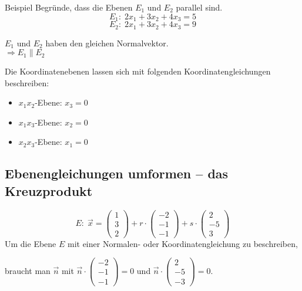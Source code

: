 \documentclass{article}
\begin{document}
\begin{boxx}[DarkBlue]{Beispiel}
    Begründe, dass die Ebenen $E_1$ und $E_2$ parallel sind.
    \[E_1:\; 2x_1 + 3x_2 + 4x_3 = 5\]
    \[E_2:\; 2x_1 + 3x_2 + 4x_3 = 9\]
    \begin{center}
        $E_1$ und $E_2$ haben den gleichen Normalvektor.\\
        $\Rightarrow E_1 \parallel E_2$
    \end{center}
\end{boxx}
Die Koordinatenebenen lassen sich mit folgenden Koordinatengleichungen beschreiben:
\begin{itemize}
    \item $x_1x_2$-Ebene: $x_3 = 0$
    \item $x_1x_3$-Ebene: $x_2 = 0$
    \item $x_2x_3$-Ebene: $x_1 = 0$
\end{itemize}
\subsection{Ebenengleichungen umformen -- das Kreuzprodukt}
\[E:\; \vec{x} = \begin{pmatrix}1\\3\\2\end{pmatrix} + r \cdot \begin{pmatrix}-2\\-1\\-1\end{pmatrix} + s \cdot \begin{pmatrix}2\\-5\\3\end{pmatrix}\]
Um die Ebene $E$ mit einer Normalen- oder Koordinatengleichung zu beschreiben, 

braucht man $\vec{n}$ mit 
$\displaystyle \vec{n} \cdot \begin{pmatrix}-2\\-1\\-1\end{pmatrix} = 0$ 
und $\displaystyle \vec{n} \cdot \begin{pmatrix}2\\-5\\-3\end{pmatrix} = 0$.
\end{document}
